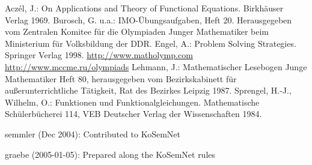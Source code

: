 \documentclass[11pt]{article}
\begin{document}
\begin{thebibliography}{99}
 Acz\'{e}l, J.: On Applications and Theory of Functional
Equations. Birkh\"{a}user Verlag 1969.
 Burosch, G. u.a.: IMO-\"{U}bungsaufgaben, Heft 20.  Herausgegeben
vom Zentralen Komitee f\"{u}r die Olympiaden Junger Mathematiker beim
Ministerium f\"{u}r Volksbildung der DDR.
 Engel, A.: Problem Solving Strategies. Springer Verlag 1998.
 \url{http://www.matholymp.com}
 \url{http://www.mccme.ru/olympiads}
 Lehmann, J.: Mathematischer Lesebogen {\glqq}Junge
Mathematiker{\grqq} Heft 80, herausgegeben vom Bezirkskabinett f\"{u}r
au{\ss}erunterrichtliche T\"{a}tigkeit, Rat des Bezirkes Leipzig 1987.
 Sprengel, H.-J., Wilhelm, O.: Funktionen und
Funktionalgleichungen. Mathematische Sch\"{u}lerb\"{u}cherei 114, VEB
Deutscher Verlag der Wissenschaften 1984.

\end{thebibliography}
\begin{attribution}
semmler (Dec 2004): Contributed to KoSemNet

graebe (2005-01-05): Prepared along the KoSemNet rules
\end{attribution}
\end{document}
